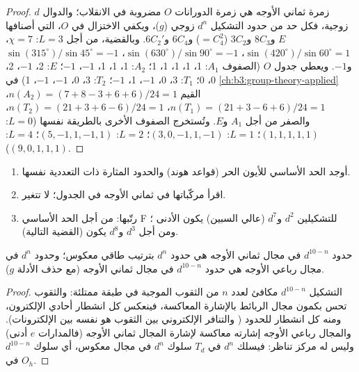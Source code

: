 \begin{proof}
زمرة ثماني الأوجه هي زمرة الدورانات $O$ مضروبة في الانقلاب؛ والدوال $d$
زوجية، فكل حد من حدود التشكيل $d^n$ زوجي ($g$)، ويكفي
الاختزال في $O$، التي أصنافها $E$ و$8C_3$ و$3C_2$ ($=C_4^2$) و$6C_4$ و$6C_2'$. وبالقضية،
من أجل $L = 3$: $\chi = 7$، $\sin(420^\circ)/\sin60^\circ = 1$، $\sin(630^\circ)/\sin90^\circ = -1$، $\sin(315^\circ)/\sin45^\circ = -1$
و$-1$. ويعطي جدول  $O$ (الصفوف $A_1$: 1، 1، 1، 1، 1؛ $A_2$: 1، 1، 1، $-1$، $-1$؛ $E$: 2،
$-1$، 2، 0، 0؛ $T_1$: 3، 0، $-1$، 1، $-1$؛ $T_2$: 3، 0، $-1$، $-1$، 1)  في
\cref{ch:b3:group-theory-applied} القيم $n(A_2) = (7 + 8 - 3 + 6 + 6)/24 = 1$، $n(T_1) = (21 + 3 - 6 +
6)/24 = 1$، $n(T_2) = (21 + 3 + 6 - 6)/24 = 1$، والصفر من أجل $A_1$ و$E$. وتُستخرج الصفوف الأخرى
بالطريقة نفسها ($L = 0$: $(1, 1, 1, 1, 1)$؛ $L = 1$: $(3, 0, -1, 1, -1)$؛ $L = 2$: $(5, -1, 1,
-1, 1)$؛ $L = 4$: $(9, 0, 1, 1, 1)$).
\end{proof}

\begin{method}\label{met:b3:complex-spectra-magnetism:split-term}
\begin{enumerate}
  \item أوجد الحد الأساسي للأيون الحر (قواعد هوند) والحدود المثارة
        ذات التعددية نفسها.
  \item اقرأ مركّباتها في ثماني الأوجه في الجدول؛ 
        لا تتغير.
  \item رتّبها: من أجل الحد الأساسي F للتشكيلين $d^2$ و$d^7$ (عالي السبين) يكون الأدنى ؛
        ومن أجل $d^3$ و$d^8$ يكون  (القضية التالية).
\end{enumerate}
\end{method}

\begin{proposition}\label{prop:b3:complex-spectra-magnetism:hole}
حدود $d^{10-n}$ في مجال ثماني الأوجه هي حدود $d^n$ بترتيب طاقي
معكوس؛ وحدود $d^n$ في مجال رباعي الأوجه هي حدود $d^{10-n}$ في مجال ثماني
الأوجه (مع حذف الأدلة $g$).
\end{proposition}

\begin{proof}
التشكيل $d^{10-n}$ مكافئ لعدد $n$ من الثقوب الموجبة في طبقة ممتلئة: 
والثقوب تحس بكمون مجال الربائط بالإشارة المعاكسة، فينعكس كل
انشطار أحادي الإلكترون، ومنه كل انشطار للحدود (
والتنافر الإلكتروني بين الثقوب هو نفسه بين الإلكترونات). والمجال
رباعي الأوجه إشارته معاكسة لإشارة المجال ثماني الأوجه (فالمدارات $e$
أدنى) وليس له مركز تناظر: فيسلك $d^n$ في $T_d$ سلوك $d^n$ في مجال معكوس،
أي سلوك $d^{10-n}$ في $O_h$.
\end{proof}

